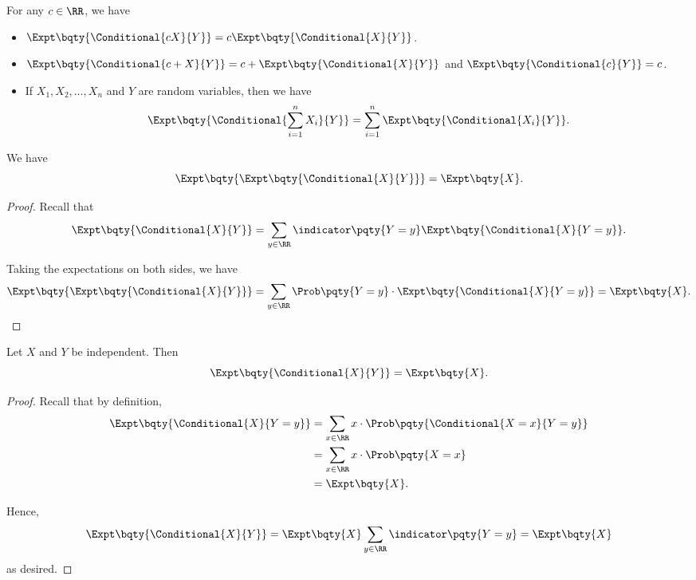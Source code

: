 \begin{proposition}
    \label{prop:conditional-expectation-distribution-property}%
    For any \(c \in \RR\), we have
    \begin{itemize}
        \item \(\Expt\bqty{\Conditional{cX}{Y}} = c \Expt\bqty{\Conditional{X}{Y}}\).
        \item \(\Expt\bqty{\Conditional{c + X}{Y}} = c + \Expt\bqty{\Conditional{X}{Y}}\) and \(\Expt\bqty{\Conditional{c}{Y}} = c\).
        \item If \(X_1, X_2, \ldots, X_n\) and \(Y\) are random variables, then we have
        \[
            \Expt\bqty{\Conditional{\sum_{i = 1}^{n} X_i}{Y}} = \sum_{i = 1}^{n} \Expt\bqty{\Conditional{X_i}{Y}}.
        \]
    \end{itemize}
\end{proposition}

\begin{proposition}
    \label{prop:expectation-conditional-expectation-distribution}%
    We have
    \[
        \Expt\bqty{\Expt\bqty{\Conditional{X}{Y}}} = \Expt\bqty{X}.
    \]
\end{proposition}

\begin{proof}
    Recall that
    \[
        \Expt\bqty{\Conditional{X}{Y}} = \sum_{y \in \RR} \indicator\pqty{Y = y} \Expt\bqty{\Conditional{X}{Y = y}}.
    \]

    Taking the expectations on both sides, we have
    \[
        \Expt\bqty{\Expt\bqty{\Conditional{X}{Y}}} = \sum_{y \in \RR} \Prob\pqty{Y = y} \cdot \Expt\bqty{\Conditional{X}{Y = y}} = \Expt\bqty{X}.
    \]
\end{proof}

\begin{proposition}
    \label{prop:conditional-expectation-distribution-independent}%
    Let \(X\) and \(Y\) be independent. Then
    \[
        \Expt\bqty{\Conditional{X}{Y}} = \Expt\bqty{X}.
    \]
\end{proposition}

\begin{proof}
    Recall that by definition,
    \begin{align*}
        \Expt\bqty{\Conditional{X}{Y = y}} &= \sum_{x \in \RR} x \cdot \Prob\pqty{\Conditional{X = x}{Y = y}} \\
        &= \sum_{x \in \RR} x \cdot \Prob\pqty{X = x} \\
        &= \Expt\bqty{X}.
    \end{align*}

    Hence,
    \[
        \Expt\bqty{\Conditional{X}{Y}} = \Expt\bqty{X} \sum_{y \in \RR} \indicator\pqty{Y = y} = \Expt\bqty{X}
    \]
    as desired.
\end{proof}

